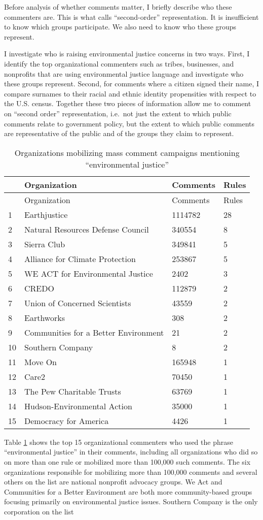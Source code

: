 \documentclass[
      12pt,
        ]{article}
\begin{document}
Before analysis of whether comments matter, I briefly describe who these
commenters are. This is what \citet{Seifter2016UCLA} calls ``second-order''
representation. It is insufficient to know which groups participate. We
also need to know who these groups represent.

I investigate who is raising environmental justice concerns in two ways.
First, I identify the top organizational commenters such as tribes,
businesses, and nonprofits that are using environmental justice language
and investigate who these groups represent. Second, for comments where a
citizen signed their name, I compare surnames to their racial and ethnic
identity propensities with respect to the U.S. census. Together these
two pieces of information allow me to comment on ``second order''
representation, i.e.~not just the extent to which public comments relate
to government policy, but the extent to which public comments are
representative of the public and of the groups they claim to represent.

\begin{longtable}[]{@{}llll@{}}
\caption{\label{tab:orgs} Organizations mobilizing mass comment campaigns mentioning ``environmental justice''}\tabularnewline
\toprule
& Organization & Comments & Rules\tabularnewline
\midrule
\endfirsthead
\toprule
& Organization & Comments & Rules\tabularnewline
\midrule
\endhead
1 & Earthjustice & 1114782 & 28\tabularnewline
2 & Natural Resources Defense Council & 340554 & 8\tabularnewline
3 & Sierra Club & 349841 & 5\tabularnewline
4 & Alliance for Climate Protection & 253867 & 5\tabularnewline
5 & WE ACT for Environmental Justice & 2402 & 3\tabularnewline
6 & CREDO & 112879 & 2\tabularnewline
7 & Union of Concerned Scientists & 43559 & 2\tabularnewline
8 & Earthworks & 308 & 2\tabularnewline
9 & Communities for a Better Environment & 21 & 2\tabularnewline
10 & Southern Company & 8 & 2\tabularnewline
11 & Move On & 165948 & 1\tabularnewline
12 & Care2 & 70450 & 1\tabularnewline
13 & The Pew Charitable Trusts & 63769 & 1\tabularnewline
14 & Hudson-Environmental Action & 35000 & 1\tabularnewline
15 & Democracy for America & 4426 & 1\tabularnewline
\bottomrule
\end{longtable}

Table \ref{tab:orgs} shows the top 15 organizational commenters who
used the phrase ``environmental justice'' in their comments, including all
organizations who did so on more than one rule or mobilized more than
100,000 such comments. The six organizations responsible for mobilizing
more than 100,000 comments and several others on the list are national
nonprofit advocacy groups. We Act and Communities for a Better
Environment are both more community-based groups focusing primarily on
environmental justice issues. Southern Company is the only corporation
on the list
\end{document}
